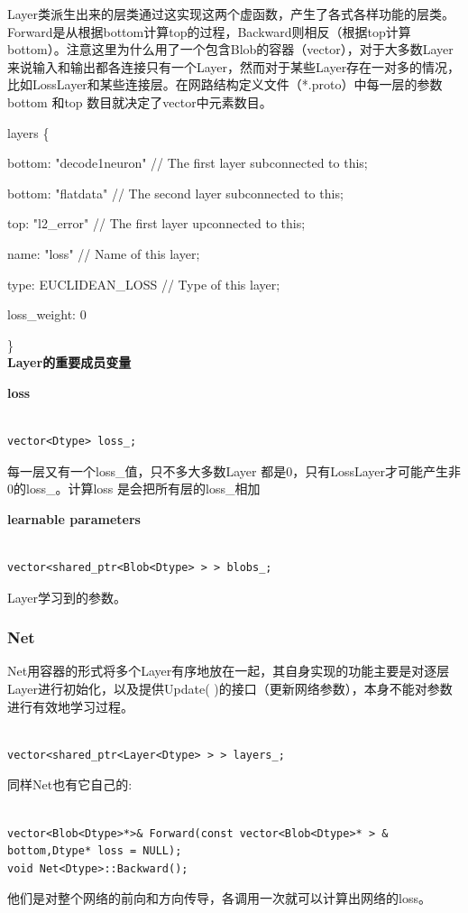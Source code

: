 \documentclass[11pt,fleqn, UTF8]{ctexbook} %
\begin{document}
Layer类派生出来的层类通过这实现这两个虚函数，产生了各式各样功能的层类。Forward是从根据bottom计算top的过程，Backward则相反（根据top计算bottom）。注意这里为什么用了一个包含Blob的容器（vector），对于大多数Layer来说输入和输出都各连接只有一个Layer，然而对于某些Layer存在一对多的情况，比如LossLayer和某些连接层。在网路结构定义文件（*.proto）中每一层的参数bottom 和top 数目就决定了vector中元素数目。

layers \{

  bottom: "decode1neuron"   // The first layer subconnected to this;

  bottom: "flatdata"        // The second layer subconnected to this;

  top: "l2\_error"           // The first layer upconnected to this;

  name: "loss"              // Name of this layer;

  type: EUCLIDEAN\_LOSS      // Type of this layer;

  loss\_weight: 0

\}
\\

\textbf{Layer的重要成员变量}

\textbf{loss}
\lstset{language=C++}
\begin{lstlisting}[frame=single]  % Start your code-block

vector<Dtype> loss_;

\end{lstlisting}
每一层又有一个loss\_值，只不多大多数Layer 都是0，只有LossLayer才可能产生非0的loss\_。计算loss 是会把所有层的loss\_相加

\textbf{learnable parameters}
\lstset{language=C++}
\begin{lstlisting}[frame=single]  % Start your code-block

vector<shared_ptr<Blob<Dtype> > > blobs_;

\end{lstlisting}
Layer学习到的参数。

\subsubsection{Net}
Net用容器的形式将多个Layer有序地放在一起，其自身实现的功能主要是对逐层Layer进行初始化，以及提供Update( )的接口（更新网络参数），本身不能对参数进行有效地学习过程。
\lstset{language=C++}
\begin{lstlisting}[frame=single]  % Start your code-block

vector<shared_ptr<Layer<Dtype> > > layers_;

\end{lstlisting}
同样Net也有它自己的:
\lstset{language=C++}
\begin{lstlisting}[frame=single]  % Start your code-block

vector<Blob<Dtype>*>& Forward(const vector<Blob<Dtype>* > & bottom,Dtype* loss = NULL);
void Net<Dtype>::Backward();

\end{lstlisting}
他们是对整个网络的前向和方向传导，各调用一次就可以计算出网络的loss。
\end{document}

